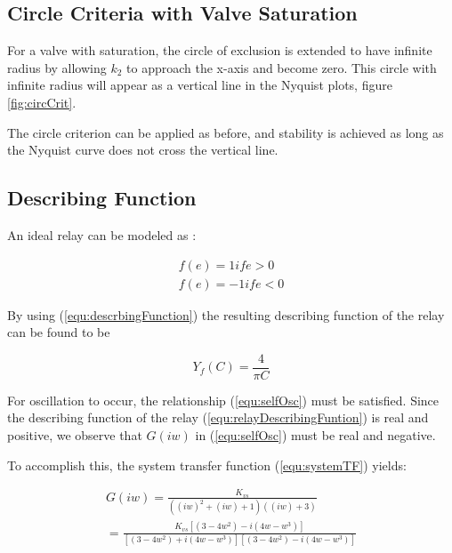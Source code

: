 \documentclass[a4paper, titlepage]{article}
\begin{document}
\subsection{Circle Criteria with Valve Saturation}

For a valve with saturation, the circle of exclusion is extended to have infinite radius by allowing $k_{2}$ to approach the x-axis and become zero.  This circle with infinite radius will appear as a vertical line in the Nyquist plots, figure \ref{fig:circCrit}.

The circle criterion can be applied as before, and stability is achieved as long as the Nyquist curve does not cross the vertical line.

\subsection{Describing Function}

An ideal relay can be modeled as \citep[p. 358]{glad00}:

\begin{equation}
\begin{split}
f(e) = 1 if e > 0 \\
f(e) = -1 if e <0
\end{split}
\label{equ:relay}
\end{equation}

By using (\ref{equ:descrbingFunction}) the resulting describing function of the relay can be found to be \citep[P. 359]{glad00}

\begin{equation}
Y_{f}(C) = \frac{4}{\pi C}
\label{equ:relayDescribingFuntion}
\end{equation}

For oscillation to occur, the relationship (\ref{equ:selfOsc}) must be satisfied.  Since the describing function of the relay (\ref{equ:relayDescribingFuntion}) is real and positive, we observe that $G(iw)$ in (\ref{equ:selfOsc}) must be real and negative.

To accomplish this, the system transfer function (\ref{equ:systemTF}) yields:

\begin{equation}
\begin{split}
G(iw) = \frac{K_{vs}}{((iw)^2+(iw)+1)((iw)+3)}\\
= \frac{K_{vs}[(3-4w^2)-i(4w-w^3)]}{[(3-4w^2)+i(4w-w^3)][(3-4w^2)-i(4w-w^3)]}
\end{split}
\label{equ:systemTFiw}
\end{equation}
\end{document}
